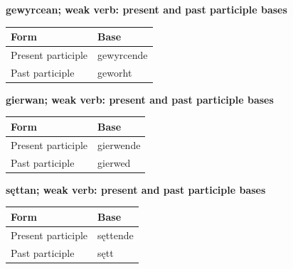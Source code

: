 \textbf{gewyrcean; weak verb: present and past participle bases}

\par\begingroup
\fontsize{10.5}{13.2}\selectfont
\setlength{\LTleft}{0pt}\setlength{\LTright}{\fill}
\noindent
\begin{tabular}{@{}>{\raggedright\arraybackslash}p{69.84mm}>{\raggedright\arraybackslash}p{51.35mm}@{}}
\toprule
\textbf{Form} & \textbf{Base} \\
\midrule
Present participle & gewyrcende \\
Past participle & geworht \\
\bottomrule
\end{tabular}
\par\endgroup

\textbf{gierwan; weak verb: present and past participle bases}

\par\begingroup
\fontsize{10.5}{13.2}\selectfont
\setlength{\LTleft}{0pt}\setlength{\LTright}{\fill}
\noindent
\begin{tabular}{@{}>{\raggedright\arraybackslash}p{69.84mm}>{\raggedright\arraybackslash}p{51.35mm}@{}}
\toprule
\textbf{Form} & \textbf{Base} \\
\midrule
Present participle & gierwende \\
Past participle & gierwed \\
\bottomrule
\end{tabular}
\par\endgroup

\textbf{sęttan; weak verb: present and past participle bases}

\par\begingroup
\fontsize{10.5}{13.2}\selectfont
\setlength{\LTleft}{0pt}\setlength{\LTright}{\fill}
\noindent
\begin{tabular}{@{}>{\raggedright\arraybackslash}p{69.84mm}>{\raggedright\arraybackslash}p{51.35mm}@{}}
\toprule
\textbf{Form} & \textbf{Base} \\
\midrule
Present participle & sęttende \\
Past participle & sętt \\
\bottomrule
\end{tabular}
\par\endgroup

